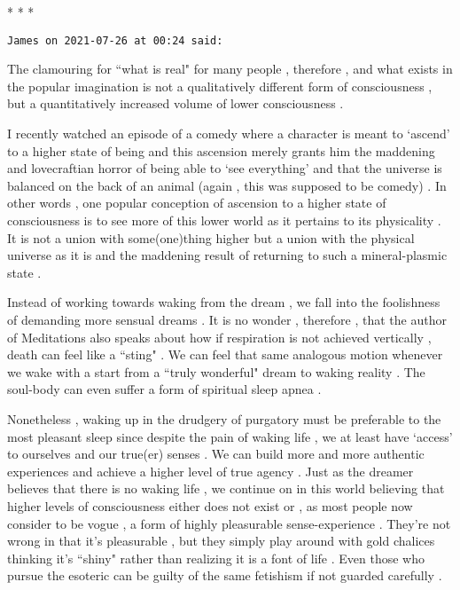 \begin{center}* * *\end{center}

\begin{footnotesize}\begin{sffamily}



\texttt{James on 2021-07-26 at 00:24 said: }

The clamouring for ``what is real" for many people , therefore , and what exists in the popular imagination is not a qualitatively different form of consciousness , but a quantitatively increased volume of lower consciousness .

I recently watched an episode of a comedy where a character is meant to `ascend' to a higher state of being and this ascension merely grants him the maddening and lovecraftian horror of being able to `see everything' and that the universe is balanced on the back of an animal (again , this was supposed to be comedy) . In other words , one popular conception of ascension to a higher state of consciousness is to see more of this lower world as it pertains to its physicality . It is not a union with some(one)thing higher but a union with the physical universe as it is and the maddening result of returning to such a mineral-plasmic state .

Instead of working towards waking from the dream , we fall into the foolishness of demanding more sensual dreams . It is no wonder , therefore , that the author of Meditations also speaks about how if respiration is not achieved vertically , death can feel like a ``sting" . We can feel that same analogous motion whenever we wake with a start from a ``truly wonderful" dream to waking reality . The soul-body can even suffer a form of spiritual sleep apnea .

Nonetheless , waking up in the drudgery of purgatory must be preferable to the most pleasant sleep since despite the pain of waking life , we at least have `access' to ourselves and our true(er) senses . We can build more and more authentic experiences and achieve a higher level of true agency . Just as the dreamer believes that there is no waking life , we continue on in this world believing that higher levels of consciousness either does not exist or , as most people now consider to be vogue , a form of highly pleasurable sense-experience . They're not wrong in that it's pleasurable , but they simply play around with gold chalices thinking it's ``shiny" rather than realizing it is a font of life . Even those who pursue the esoteric can be guilty of the same fetishism if not guarded carefully .


\end{sffamily}
\end{footnotesize}

